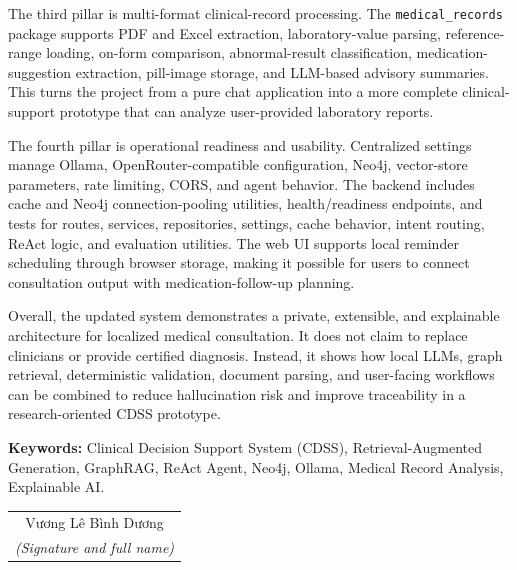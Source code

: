 \documentclass[../main.tex]{subfiles}
\begin{document}
The third pillar is multi-format clinical-record processing. The \texttt{medical\_records} package supports PDF and Excel extraction, laboratory-value parsing, reference-range loading, on-form comparison, abnormal-result classification, medication-suggestion extraction, pill-image storage, and LLM-based advisory summaries. This turns the project from a pure chat application into a more complete clinical-support prototype that can analyze user-provided laboratory reports.

The fourth pillar is operational readiness and usability. Centralized settings manage Ollama, OpenRouter-compatible configuration, Neo4j, vector-store parameters, rate limiting, CORS, and agent behavior. The backend includes cache and Neo4j connection-pooling utilities, health/readiness endpoints, and tests for routes, services, repositories, settings, cache behavior, intent routing, ReAct logic, and evaluation utilities. The web UI supports local reminder scheduling through browser storage, making it possible for users to connect consultation output with medication-follow-up planning.

Overall, the updated system demonstrates a private, extensible, and explainable architecture for localized medical consultation. It does not claim to replace clinicians or provide certified diagnosis. Instead, it shows how local LLMs, graph retrieval, deterministic validation, document parsing, and user-facing workflows can be combined to reduce hallucination risk and improve traceability in a research-oriented CDSS prototype.

\vspace{0.5cm}
\noindent \textbf{Keywords:} Clinical Decision Support System (CDSS), Retrieval-Augmented Generation, GraphRAG, ReAct Agent, Neo4j, Ollama, Medical Record Analysis, Explainable AI.

\begin{flushright}
\begin{tabular}{@{}c@{}}
Vương Lê Bình Dương\\
\textit{(Signature and full name)}
\end{tabular}
\end{flushright}
\end{document}
